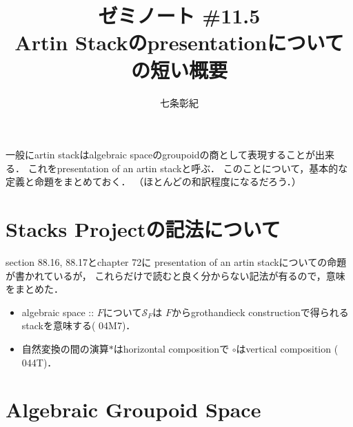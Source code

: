 

\def\changemargin#1#2{\list{}{\rightmargin#2\leftmargin#1}\item[]}
\let\endchangemargin=\endlist 


\title{ゼミノート \#11.5 \\ Artin Stackのpresentationについての短い概要}
\author{七条彰紀}
\maketitle
\tableofcontents
\vspace{10pt}

一般にartin stackはalgebraic spaceのgroupoidの商として表現することが出来る．
これをpresentation of an artin stackと呼ぶ．
このことについて，基本的な定義と命題をまとめておく．
（ほとんど\cite{SP}の和訳程度になるだろう．）

\section*{Stacks Projectの記法について}
    \cite{SP} section 88.16, 88.17とchapter 72に
    presentation of an artin stackについての命題が書かれているが，
    これらだけで読むと良く分からない記法が有るので，意味をまとめた．

    \begin{itemize}
    \item 
        algebraic space :: $F$について$\mathcal{S}_F$は
        $F$からgrothandieck constructionで得られるstackを意味する(\cite{SP} 04M7)．

    \item
        自然変換の間の演算$\ast$はhorizontal compositionで
        $\circ$はvertical composition (\cite{SP} 044T)．
    \end{itemize}

\section{Algebraic Groupoid Space}
\newpage

